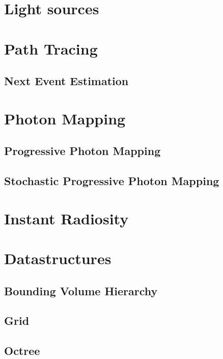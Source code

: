 \section{Light sources}


\section{Path Tracing}
\subsection{Next Event Estimation}
\label{sec:NEE}


\section{Photon Mapping}
\label{sec:PM}

\subsection{Progressive Photon Mapping}

\subsection{Stochastic Progressive Photon Mapping}



\section{Instant Radiosity}

\section{Datastructures}


\subsection{Bounding Volume Hierarchy}
\subsection{Grid}
\subsection{Octree}
